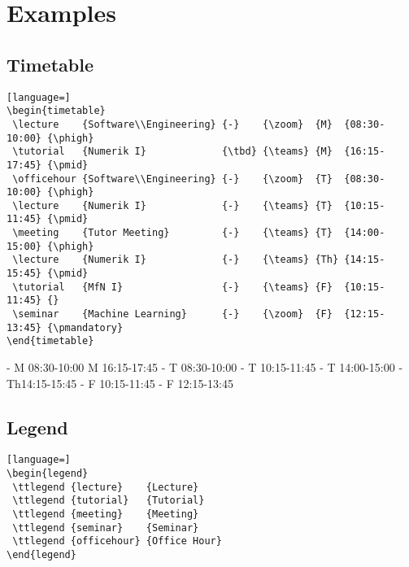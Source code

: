\documentclass{article}
\begin{document}
	\pagebreak
	\section{Examples}
	\subsection{Timetable}
	\begin{lstlisting}[language=]
\begin{timetable}			
 \lecture    {Software\\Engineering} {-}    {\zoom}  {M}  {08:30-10:00} {\phigh}		
 \tutorial   {Numerik I}             {\tbd} {\teams} {M}  {16:15-17:45} {\pmid}
 \officehour {Software\\Engineering} {-}    {\zoom}  {T}  {08:30-10:00} {\phigh}	
 \lecture    {Numerik I}             {-}    {\teams} {T}  {10:15-11:45} {\pmid}	
 \meeting    {Tutor Meeting}         {-}    {\teams} {T}  {14:00-15:00} {\phigh}	
 \lecture    {Numerik I}             {-}    {\teams} {Th} {14:15-15:45} {\pmid}	
 \tutorial   {MfN I}                 {-}    {\teams} {F}  {10:15-11:45} {}
 \seminar    {Machine Learning}      {-}    {\zoom}  {F}  {12:15-13:45} {\pmandatory}	
\end{timetable}		
	\end{lstlisting}	
	\begin{timetable}			
						{-}		{\teams}			{M}	{08:30-10:00}	{\phigh}		
									{\tbd}	{\teams}			{M}	{16:15-17:45}	{\pmid}
						{-}		{\teams}			{T}	{08:30-10:00}	{\phigh}	
									{-}		{\teams}			{T}	{10:15-11:45}	{\pmid}	
								{-}		{\teams}			{T}	{14:00-15:00}	{\phigh}	
									{-}		{\teams}			{Th}{14:15-15:45}	{\pmid}	
										{-}		{\teams}			{F}	{10:15-11:45}	{}
							{-}		{\teams}			{F}	{12:15-13:45}	{\pmandatory}	
	\end{timetable}
	
	\pagebreak
	\subsection{Legend}
	\begin{lstlisting}[language=]
\begin{legend}
 \ttlegend {lecture}    {Lecture}
 \ttlegend {tutorial}   {Tutorial}
 \ttlegend {meeting}    {Meeting}
 \ttlegend {seminar}    {Seminar}
 \ttlegend {officehour} {Office Hour}
\end{legend}		
	\end{lstlisting}
	\begin{legend}
	\end{legend}
	
\end{document}
